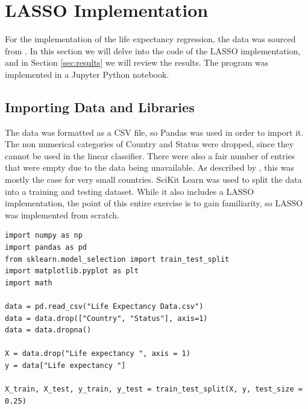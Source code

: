 \documentclass[journal,onecolumn]{IEEEtran}
\begin{document}
\section{LASSO Implementation}\label{sec:lasso}
For the implementation of the life expectancy regression, the data was sourced from \cite{dataset}. In this section we will delve into the code of the LASSO implementation, and in Section \ref{sec:results} we will review the results. The program was implemented in a Jupyter Python notebook.

\subsection{Importing Data and Libraries}
The data was formatted as a CSV file, so Pandas was used in order to import it. The non numerical categories of Country and Status were dropped, since they cannot be used in the linear classifier. There were also a fair number of entries that were empty due to the data being unavailable. As described by \cite{dataset}, this was mostly the case for very small countries. SciKit Learn was used to split the data into a training and testing dataset. While it also includes a LASSO implementation, the point of this entire exercise is to gain familiarity, so LASSO was implemented from scratch.
\begin{verbatim}
import numpy as np
import pandas as pd
from sklearn.model_selection import train_test_split
import matplotlib.pyplot as plt
import math

data = pd.read_csv("Life Expectancy Data.csv")
data = data.drop(["Country", "Status"], axis=1)
data = data.dropna()

X = data.drop("Life expectancy ", axis = 1)
y = data["Life expectancy "]

X_train, X_test, y_train, y_test = train_test_split(X, y, test_size = 0.25)
\end{verbatim}
\end{document}
